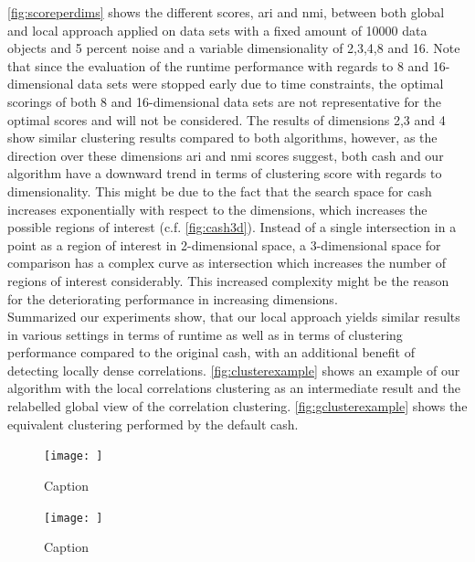\autoref{fig:scoreperdims} shows the different scores, \gls{ari} and \gls{nmi}, between both global and local approach applied on data sets with a fixed amount of 10000 data objects and 5 percent noise and a variable dimensionality of 2,3,4,8 and 16.
Note that since the evaluation of the runtime performance with regards to 8 and 16-dimensional data sets were stopped early due to time constraints, the optimal scorings of both 8 and 16-dimensional data sets are not representative for the optimal scores and will not be considered. 
The results of dimensions 2,3 and 4 show similar clustering results compared to both algorithms, however, as the direction over these dimensions \gls{ari} and \gls{nmi} scores suggest, both \gls{cash} and our algorithm have a downward trend in terms of clustering score with regards to dimensionality. This might be due to the fact that the search space for \gls{cash} increases exponentially with respect to the dimensions, which increases the possible regions of interest (c.f. \autoref{fig:cash3d}). Instead of a single intersection in a point as a region of interest in 2-dimensional space, a 3-dimensional space for comparison has a complex curve as intersection which increases the number of regions of interest considerably. This increased complexity might be the reason for the deteriorating performance in increasing dimensions. \\

Summarized our experiments show, that our local approach yields similar results in various settings in terms of runtime as well as in terms of clustering performance compared to the original \gls{cash}, with an additional benefit of detecting locally dense correlations. \autoref{fig:clusterexample} shows an example of our algorithm with the local correlations clustering as an intermediate result and the relabelled global view of the correlation clustering. \autoref{fig:gclusterexample} shows the equivalent clustering performed by the default \gls{cash}. 

\begin{figure}
    \centering
    \texttt{[image: ]}
    \caption{Caption}
    \label{fig:clusterexample}
\end{figure}

\begin{figure}
    \centering
    \texttt{[image: ]}
    \caption{Caption}
    \label{fig:gclusterexample}
\end{figure}

